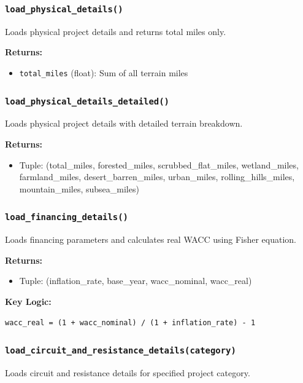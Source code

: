 \documentclass[ctcc_full_documentation.tex]{subfiles}
\begin{document}
\subsubsection{\texttt{load\_physical\_details()}}

Loads physical project details and returns total miles only.

\textbf{Returns:}
\begin{itemize}
    \item \texttt{total\_miles} (float): Sum of all terrain miles
\end{itemize}

\subsubsection{\texttt{load\_physical\_details\_detailed()}}

Loads physical project details with detailed terrain breakdown.

\textbf{Returns:}
\begin{itemize}
    \item Tuple: (total\_miles, forested\_miles, scrubbed\_flat\_miles, wetland\_miles, farmland\_miles, desert\_barren\_miles, urban\_miles, rolling\_hills\_miles, mountain\_miles, subsea\_miles)
\end{itemize}

\subsubsection{\texttt{load\_financing\_details()}}

Loads financing parameters and calculates real WACC using Fisher equation.

\textbf{Returns:}
\begin{itemize}
    \item Tuple: (inflation\_rate, base\_year, wacc\_nominal, wacc\_real)
\end{itemize}

\textbf{Key Logic:}
\begin{lstlisting}
wacc_real = (1 + wacc_nominal) / (1 + inflation_rate) - 1
\end{lstlisting}

\subsubsection{\texttt{load\_circuit\_and\_resistance\_details(category)}}

Loads circuit and resistance details for specified project category.
\end{document}
